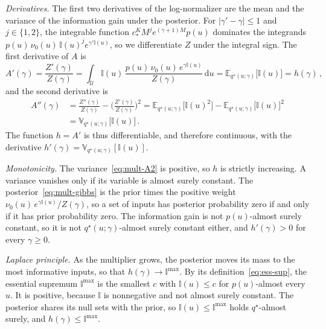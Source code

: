 \documentclass{l4dc2027}
\def\rmd{\mathrm{d}}
\def\cU{\mathcal{U}}
\newcommand{\E}{\mathbb{E}}
\newcommand{\Var}{\mathbb{V}}
\newenvironment{proofof}[1]{\par\noindent{\bfseries\upshape Proof of #1\ }}{\jmlrQED}
\begin{document}
\begin{proofof}{Lemma~\ref{lem:multiplier}}
\emph{Derivatives.} The first two derivatives of the log-normalizer are the mean and the variance of the information gain under the posterior. For $|\gamma' - \gamma| \leq 1$ and $j \in \{1, 2\}$, the integrable function $c_*^K M^j e^{(\gamma + 1) M} p(u)$ dominates the integrands $p(u)\, \nu_0(u)\, \mathbb{I}(u)^j e^{\gamma' \mathbb{I}(u)}$, so we differentiate $Z$ under the integral sign. The first derivative of $A$ is
\begin{equation}\label{eq:mult-A1}
	A'(\gamma) = \frac{Z'(\gamma)}{Z(\gamma)} = \int_{\cU} \mathbb{I}(u)\, \frac{p(u)\, \nu_0(u)\, e^{\gamma \mathbb{I}(u)}}{Z(\gamma)}\, \rmd u = \E_{q^\star(u;\gamma)}\big[\mathbb{I}(u)\big] = h(\gamma) \, ,
\end{equation}
and the second derivative is
\begin{align}
	A''(\gamma) &= \frac{Z''(\gamma)}{Z(\gamma)} - \bigg( \frac{Z'(\gamma)}{Z(\gamma)} \bigg)^{2} = \E_{q^\star(u;\gamma)}\big[\mathbb{I}(u)^2\big] - \E_{q^\star(u;\gamma)}\big[\mathbb{I}(u)\big]^2 \nonumber\\
	&= \Var_{q^\star(u;\gamma)}\big[\mathbb{I}(u)\big] \, . \label{eq:mult-A2}
\end{align}
The function $h = A'$ is thus differentiable, and therefore continuous, with the derivative $h'(\gamma) = \Var_{q^\star(u;\gamma)}[\mathbb{I}(u)]$.

\emph{Monotonicity.} The variance~\eqref{eq:mult-A2} is positive, so $h$ is strictly increasing. A variance vanishes only if its variable is almost surely constant. The posterior~\eqref{eq:mult-gibbs} is the prior times the positive weight $\nu_0(u)\, e^{\gamma \mathbb{I}(u)}/Z(\gamma)$, so a set of inputs has posterior probability zero if and only if it has prior probability zero. The information gain is not $p(u)$-almost surely constant, so it is not $q^\star(u;\gamma)$-almost surely constant either, and $h'(\gamma) > 0$ for every $\gamma \geq 0$.

\emph{Laplace principle.} As the multiplier grows, the posterior moves its mass to the most informative inputs, so that $h(\gamma) \to \mathbb{I}^{\max}$. By its definition~\eqref{eq:ess-sup}, the essential supremum $\mathbb{I}^{\max}$ is the smallest $c$ with $\mathbb{I}(u) \leq c$ for $p(u)$-almost every $u$. It is positive, because $\mathbb{I}$ is nonnegative and not almost surely constant. The posterior shares its null sets with the prior, so $\mathbb{I}(u) \leq \mathbb{I}^{\max}$ holds $q^\star$-almost surely, and $h(\gamma) \leq \mathbb{I}^{\max}$.


\end{proofof}
\end{document}
